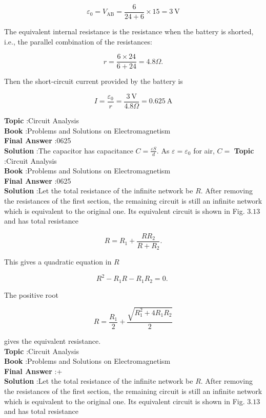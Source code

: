 \documentclass[10pt]{article}
\begin{document}
$$
\varepsilon_{0}=V_{\mathrm{AB}}=\frac{6}{24+6} \times 15=3 \mathrm{~V}
$$

The equivalent internal resistance is the resistance when the battery is shorted, i.e., the parallel combination of the resistances:

$$
r=\frac{6 \times 24}{6+24}=4.8 \Omega .
$$

Then the short-circuit current provided by the battery is

$$
I=\frac{\varepsilon_{0}}{r}=\frac{3 \mathrm{~V}}{4.8 \Omega}=0.625 \mathrm{~A}
$$

\textbf{Topic} :Circuit Analysis\\
\textbf{Book} :Problems and Solutions on Electromagnetism\\
\textbf{Final Answer} :0625 \\


\textbf{Solution} :The capacitor has capacitance $C=\frac{\varepsilon S}{d}$. As $\varepsilon=\varepsilon_{0}$ for air, $C=$
\textbf{Topic} :Circuit Analysis\\
\textbf{Book} :Problems and Solutions on Electromagnetism\\
\textbf{Final Answer} :0625 \\


\textbf{Solution} :Let the total resistance of the infinite network be $R$. After removing the resistances of the first section, the remaining circuit is still an infinite network which is equivalent to the original one. Its equivalent circuit is shown in Fig. $3.13$ and has total resistance

$$
R=R_{1}+\frac{R R_{2}}{R+R_{2}} .
$$

This gives a quadratic equation in $R$

$$
R^{2}-R_{1} R-R_{1} R_{2}=0 \text {. }
$$

The positive root

$$
R=\frac{R_{1}}{2}+\frac{\sqrt{R_{1}^{2}+4 R_{1} R_{2}}}{2}
$$

gives the equivalent resistance.
\\
\textbf{Topic} :Circuit Analysis\\
\textbf{Book} :Problems and Solutions on Electromagnetism\\
\textbf{Final Answer} :+\\


\textbf{Solution} :Let the total resistance of the infinite network be $R$. After removing the resistances of the first section, the remaining circuit is still an infinite network which is equivalent to the original one. Its equivalent circuit is shown in Fig. $3.13$ and has total resistance
\end{document}

